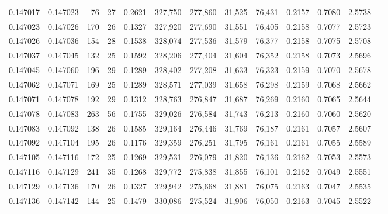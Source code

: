 \begin{tabular}{rrrrrrrrrrrrr}
0.147017 & 0.147023 &  76 &  27 &                                     0.2621 & 327,750 & 277,860 &  31,525 &  76,431 & 0.2157 & 0.7080 & 2.5738 \\
0.147023 & 0.147026 & 170 &  26 &                                     0.1327 & 327,920 & 277,690 &  31,551 &  76,405 & 0.2158 & 0.7077 & 2.5723 \\
0.147026 & 0.147036 & 154 &  28 &                                     0.1538 & 328,074 & 277,536 &  31,579 &  76,377 & 0.2158 & 0.7075 & 2.5708 \\
0.147037 & 0.147045 & 132 &  25 &                                     0.1592 & 328,206 & 277,404 &  31,604 &  76,352 & 0.2158 & 0.7073 & 2.5696 \\
0.147045 & 0.147060 & 196 &  29 &                                     0.1289 & 328,402 & 277,208 &  31,633 &  76,323 & 0.2159 & 0.7070 & 2.5678 \\
0.147062 & 0.147071 & 169 &  25 &                                     0.1289 & 328,571 & 277,039 &  31,658 &  76,298 & 0.2159 & 0.7068 & 2.5662 \\
0.147071 & 0.147078 & 192 &  29 &                                     0.1312 & 328,763 & 276,847 &  31,687 &  76,269 & 0.2160 & 0.7065 & 2.5644 \\
0.147078 & 0.147083 & 263 &  56 &                                     0.1755 & 329,026 & 276,584 &  31,743 &  76,213 & 0.2160 & 0.7060 & 2.5620 \\
0.147083 & 0.147092 & 138 &  26 &                                     0.1585 & 329,164 & 276,446 &  31,769 &  76,187 & 0.2161 & 0.7057 & 2.5607 \\
0.147092 & 0.147104 & 195 &  26 &                                     0.1176 & 329,359 & 276,251 &  31,795 &  76,161 & 0.2161 & 0.7055 & 2.5589 \\
0.147105 & 0.147116 & 172 &  25 &                                     0.1269 & 329,531 & 276,079 &  31,820 &  76,136 & 0.2162 & 0.7053 & 2.5573 \\
0.147116 & 0.147129 & 241 &  35 &                                     0.1268 & 329,772 & 275,838 &  31,855 &  76,101 & 0.2162 & 0.7049 & 2.5551 \\
0.147129 & 0.147136 & 170 &  26 &                                     0.1327 & 329,942 & 275,668 &  31,881 &  76,075 & 0.2163 & 0.7047 & 2.5535 \\
0.147136 & 0.147142 & 144 &  25 &                                     0.1479 & 330,086 & 275,524 &  31,906 &  76,050 & 0.2163 & 0.7045 & 2.5522 \\

\end{tabular}
